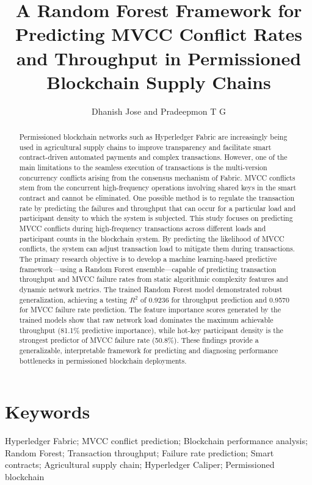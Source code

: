 ﻿\documentclass[12pt]{article}
\title{A Random Forest Framework for Predicting MVCC Conflict Rates and Throughput in Permissioned Blockchain Supply Chains}
\author{Dhanish Jose and Pradeepmon T G}
\affil{Department of Mechanical Engineering, National Institute of Technology Calicut, India}
\date{}
\begin{document}
	
	\maketitle
		\begin{abstract}
Permissioned blockchain networks such as Hyperledger Fabric are increasingly being used in agricultural supply chains to improve transparency and facilitate smart contract-driven automated payments and complex transactions. However, one of the main limitations to the seamless execution of transactions is the multi-version concurrency conflicts arising from the consensus mechanism of Fabric. MVCC conflicts stem from the concurrent high-frequency operations involving shared keys in the smart contract and cannot be eliminated. One possible method is to regulate the transaction rate by predicting the failures and throughput that can occur for a particular load and participant density to which the system is subjected. This study focuses on predicting MVCC conflicts during high-frequency transactions across different loads and participant counts in the blockchain system. By predicting the likelihood of MVCC conflicts, the system can adjust transaction load to mitigate them during transactions. The primary research objective is to develop a machine learning-based predictive framework---using a Random Forest ensemble---capable of predicting transaction throughput and MVCC failure rates from static algorithmic complexity features and dynamic network metrics. The trained Random Forest model demonstrated robust generalization, achieving a testing $R^2$ of 0.9236 for throughput prediction and 0.9570 for MVCC failure rate prediction. The feature importance scores generated by the trained models show that raw network load dominates the maximum achievable throughput (81.1\% predictive importance), while hot-key participant density is the strongest predictor of MVCC failure rate (50.8\%). These findings provide a generalizable, interpretable framework for predicting and diagnosing performance bottlenecks in permissioned blockchain deployments.
\end{abstract}
	
	
	
	
	
	\section*{Keywords}
	Hyperledger Fabric; MVCC conflict prediction; Blockchain performance analysis; 
	Random Forest; Transaction throughput; Failure rate prediction; Smart contracts; 
	Agricultural supply chain; Hyperledger Caliper; Permissioned blockchain
	
\end{document}
